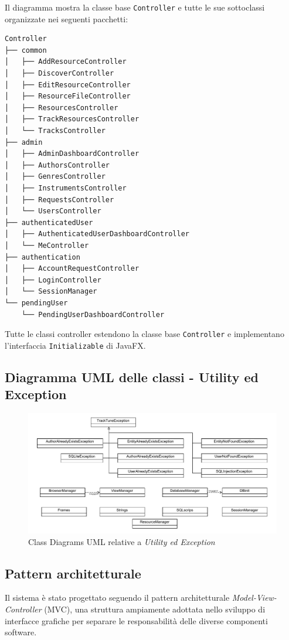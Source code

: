 \documentclass[a4paper]{article}
\begin{document}
Il diagramma mostra la classe base \texttt{Controller} e tutte le sue sottoclassi organizzate nei seguenti pacchetti:
\begin{lstlisting}[basicstyle=\ttfamily\small,label={lst:lstlisting}]
Controller
├── common
│   ├── AddResourceController
│   ├── DiscoverController
│   ├── EditResourceController
│   ├── ResourceFileController
│   ├── ResourcesController
│   ├── TrackResourcesController
│   └── TracksController
├── admin
│   ├── AdminDashboardController
│   ├── AuthorsController
│   ├── GenresController
│   ├── InstrumentsController
│   ├── RequestsController
│   └── UsersController
├── authenticatedUser
│   ├── AuthenticatedUserDashboardController
│   └── MeController
├── authentication
│   ├── AccountRequestController
│   ├── LoginController
│   └── SessionManager
└── pendingUser
    └── PendingUserDashboardController
\end{lstlisting}

Tutte le classi controller estendono la classe base \texttt{Controller} e implementano l'interfaccia \texttt{Initializable} di JavaFX.

\subsection{Diagramma UML delle classi - Utility ed Exception}
\begin{figure}[H]
    \centering
    \includegraphics[width=1.1 \textwidth]{./figures/uml_table_altri_package}
    \caption{Class Diagrams UML relative a \textit{Utility ed Exception}}
    \label{fig:uml_table_altri_package}
\end{figure}

\subsection{Pattern architetturale}
Il sistema è stato progettato seguendo il pattern architetturale \textit{Model-View-Controller} (MVC), una struttura ampiamente adottata nello sviluppo di interfacce grafiche per separare le responsabilità delle diverse componenti software.
\end{document}
